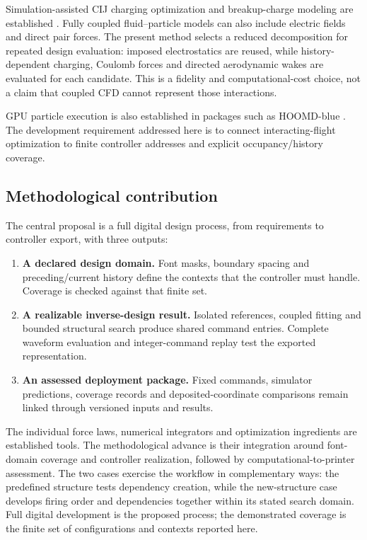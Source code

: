 \documentclass[11pt,letterpaper]{article}
\begin{document}
Simulation-assisted CIJ charging optimization and breakup-charge modeling are established \citep{sato2022,sturma2023}. Fully coupled fluid--particle models can also include electric fields and direct pair forces. The present method selects a reduced decomposition for repeated design evaluation: imposed electrostatics are reused, while history-dependent charging, Coulomb forces and directed aerodynamic wakes are evaluated for each candidate. This is a fidelity and computational-cost choice, not a claim that coupled CFD cannot represent those interactions.

GPU particle execution is also established in packages such as HOOMD-blue \citep{anderson2019}. The development requirement addressed here is to connect interacting-flight optimization to finite controller addresses and explicit occupancy/history coverage.

\subsection{Methodological contribution}
The central proposal is a full digital design process, from requirements to controller export, with three outputs:
\begin{enumerate}
\item \textbf{A declared design domain.} Font masks, boundary spacing and preceding/current history define the contexts that the controller must handle. Coverage is checked against that finite set.
\item \textbf{A realizable inverse-design result.} Isolated references, coupled fitting and bounded structural search produce shared command entries. Complete waveform evaluation and integer-command replay test the exported representation.
\item \textbf{An assessed deployment package.} Fixed commands, simulator predictions, coverage records and deposited-coordinate comparisons remain linked through versioned inputs and results.
\end{enumerate}
The individual force laws, numerical integrators and optimization ingredients are established tools. The methodological advance is their integration around font-domain coverage and controller realization, followed by computational-to-printer assessment. The two cases exercise the workflow in complementary ways: the predefined structure tests dependency creation, while the new-structure case develops firing order and dependencies together within its stated search domain. Full digital development is the proposed process; the demonstrated coverage is the finite set of configurations and contexts reported here.
\end{document}
